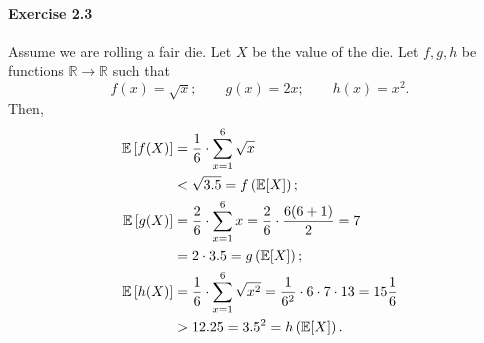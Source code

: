 \paragraph{Exercise 2.3} Assume we are rolling a fair die. Let $X$ be the value
of the die. Let $f,g,h$ be functions $\mathbb{R} \to \mathbb{R}$ such that
\[
  f(x) = \sqrt{x}; \quad \quad g(x) = 2x; \quad \quad h(x) = x^2.
\]
Then,
\begin{align*}
  \mathbb{E}\left[ f(X) \right]
    &= \frac{1}{6} \cdot \sum_{x=1}^6 \sqrt{x} \\
    &< \sqrt{3.5} = f\left( \mathbb{E}[X] \right); \\
  \mathbb{E}\left[ g(X) \right]
    &= \frac{2}{6} \cdot \sum_{x=1}^6 x = \frac{2}{6} \cdot \frac{6(6+1)}{2} = 7 \\
    &= 2 \cdot 3.5 = g\left( \mathbb{E}[X] \right); \\
  \mathbb{E}\left[ h(X) \right]
    &= \frac{1}{6} \cdot \sum_{x=1}^6 \sqrt{x^2} = \frac{1}{6^2} \cdot 6 \cdot 7 \cdot 13 = 15 \frac{1}{6} \\
    &> 12.25 = 3.5^2 = h\left( \mathbb{E}[X] \right).
\end{align*}
